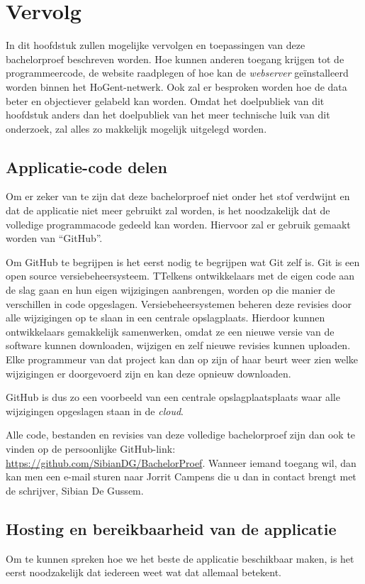 \chapter{Vervolg}
\label{ch:vervolg}

In dit hoofdstuk zullen mogelijke vervolgen en toepassingen van deze bachelorproef beschreven worden. Hoe kunnen anderen toegang krijgen tot de programmeercode, de website raadplegen of hoe kan de \textit{webserver} geïnstalleerd worden binnen het HoGent-netwerk. Ook zal er besproken worden hoe de data beter en objectiever gelabeld kan worden. Omdat het doelpubliek van dit hoofdstuk anders dan het doelpubliek van het meer technische luik van dit onderzoek, zal alles zo makkelijk mogelijk uitgelegd worden.

\section{Applicatie-code delen}
Om er zeker van te zijn dat deze bachelorproef niet onder het stof verdwijnt en dat de applicatie niet meer gebruikt zal worden, is het noodzakelijk dat de volledige programmacode gedeeld kan worden. Hiervoor zal er gebruik gemaakt worden van ``GitHub''.

Om GitHub te begrijpen is het eerst nodig te begrijpen wat Git zelf is. Git is een open source versiebeheersysteem. TTelkens ontwikkelaars met de eigen code aan de slag gaan en hun eigen wijzigingen aanbrengen, worden op die manier de verschillen in code opgeslagen. Versiebeheersystemen beheren deze revisies door alle wijzigingen op te slaan in een centrale opslagplaats. Hierdoor kunnen ontwikkelaars gemakkelijk samenwerken, omdat ze een nieuwe versie van de software kunnen downloaden, wijzigen en zelf nieuwe revisies kunnen uploaden. Elke programmeur van dat project kan dan op zijn of haar beurt weer zien welke wijzigingen er doorgevoerd zijn en kan deze opnieuw downloaden.~\autocite{Brown2019}

GitHub is dus zo een voorbeeld van een centrale opslagplaatsplaats waar alle wijzigingen opgeslagen staan in de \textit{cloud}.

Alle code, bestanden en revisies van deze volledige bachelorproef zijn dan ook te vinden op de persoonlijke GitHub-link: \url{https://github.com/SibianDG/BachelorProef}. Wanneer iemand toegang wil, dan kan men een e-mail sturen naar Jorrit Campens die u dan in contact brengt met de schrijver, Sibian De Gussem.

\section{Hosting en bereikbaarheid van de applicatie}
Om te kunnen spreken hoe we het beste de applicatie beschikbaar maken, is het eerst noodzakelijk dat iedereen weet wat dat allemaal betekent.

